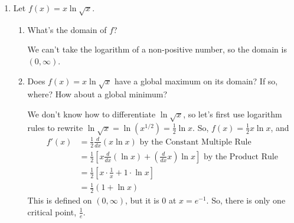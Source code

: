 \documentclass{article}
\begin{document}
\begin{enumerate}[resume]
\begin{enumerate}
    \begin{solution}
      We can use the Quotient Rule. Optionally, we can try to simplify.
      \begin{align*}
          g'(w) &= \frac{\frac{1}{w\ln7}\cdot 7^w - 7^w\ln7 \log_7(w)}{(7^w)^2} \\
          &= \frac{\frac{1}{w\ln7}-\ln7 \log_7{w}}{7^w} \\
          &= \frac{1-(\ln 7)^2w\log_7 w}{7^w w \ln 7} \\
          &= \frac{1-(\ln 7)^2w\frac{\ln w}{\ln7}}{7^w w \ln 7} \\
          &= \boxed{\frac{1-(\ln7) w\ln w}{7^w w \ln 7}}
      \end{align*}
    \end{solution}

  \end{enumerate}

\item  

  Let $f(x) = x \ln \sqrt{x}$.
  \begin{enumerate}
  \item
    \begin{problem}[0.5in]
      What's the domain of $f$? 
    \end{problem}

    \begin{solution}
      We can't take the logarithm of a non-positive number, so the
      domain is $(0, \infty)$.
    \end{solution}

  \item

    \begin{problem}[\stretch{2}]
      Does $f(x) = x \ln \sqrt{x}$ have a global maximum on its domain? If so, where? How about a global minimum? 
    \end{problem}

    \begin{solution} 
      We don't know how to differentiate $\ln \sqrt{x}$, so let's first use logarithm rules to rewrite $\ln \sqrt{x} = \ln \left( x^{1/2} \right) = \frac{1}{2} \ln x$. So, $f(x) = \frac{1}{2} x \ln x$, and
      \begin{align*}
        f'(x) &= \frac{1}{2} \frac{d}{dx} (x \ln x) \text{ by the Constant Multiple Rule} \\
        &= \frac{1}{2} \left[ x \frac{d}{dx} (\ln x) + \left( \frac{d}{dx} x \right) \ln x \right] \text{ by the Product Rule} \\
        &= \frac{1}{2} \left[ x \cdot \frac{1}{x} + 1 \cdot \ln x \right] \\
        &= \frac{1}{2} \left( 1 + \ln x \right)
      \end{align*}
      This is defined on $(0, \infty)$, but it is 0 at $x = e^{-1}$. So, there is only one critical point, $\frac{1}{e}$.


\end{solution}
\end{enumerate}
\end{enumerate}
\end{document}

